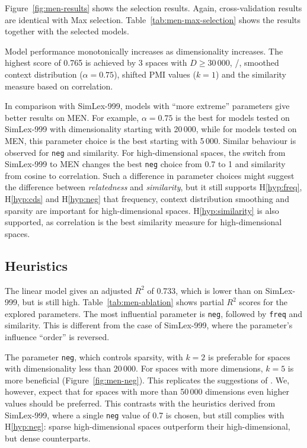 

Figure~\ref{fig:men-results} shows the selection results. Again, cross-validation results are identical with Max selection. Table~\ref{tab:men-max-selection} shows the results together with the selected models.

Model performance monotonically increases as dimensionality increases. The highest score of 0.765 is achieved by 3 spaces with $D \geq 30\,000$, \logNSCPMI/, smoothed context distribution ($\alpha = 0.75$), shifted PMI values ($k = 1$) and the similarity measure based on correlation.

In comparison with SimLex-999, models with ``more extreme'' parameters give better results on MEN. For example, $\alpha = 0.75$ is the best for models tested on SimLex-999 with dimensionality starting with 20\,000, while for models tested on MEN, this parameter choice is the best starting with 5\,000. Similar behaviour is observed for \texttt{neg} and similarity. For high-dimensional spaces, the switch from SimLex-999 to MEN changes the best \texttt{neg} choice from 0.7 to 1 and similarity from cosine to correlation. Such a difference in parameter choices might suggest the difference between \textit{relatedness} and \textit{similarity}, but it still supports H\ref{hyp:freq}, H\ref{hyp:cds} and H\ref{hyp:neg} that frequency, context distribution smoothing and sparsity are important for high-dimensional spaces. H\ref{hyp:similarity} is also supported, as correlation is the best similarity measure for high-dimensional spaces.

\subsection{Heuristics}
\label{sec:heuristics-men}


The linear model gives an adjusted $R^2$ of 0.733, which is lower than on SimLex-999, but is still high. Table~\ref{tab:men-ablation} shows partial $R^2$ scores for the explored parameters. The most influential parameter is \texttt{neg}, followed by \texttt{freq} and similarity. This is different from the case of SimLex-999, where the parameter's influence ``order'' is reversed.


The parameter \texttt{neg}, which controls sparsity, with $k = 2$ is preferable for spaces with dimensionality less than 20\,000. For spaces with more dimensions,
$k = 5$ is more beneficial (Figure~\ref{fig:men-neg}). This replicates the suggestions of . We, however, expect that for spaces with more than 50\,000 dimensions even higher values should be preferred. This contrasts with the heuristics derived from SimLex-999, where a single \texttt{neg} value of 0.7 is chosen, but still complies with H\ref{hyp:neg}: sparse high-dimensional spaces outperform their high-dimensional, but dense counterparts.

